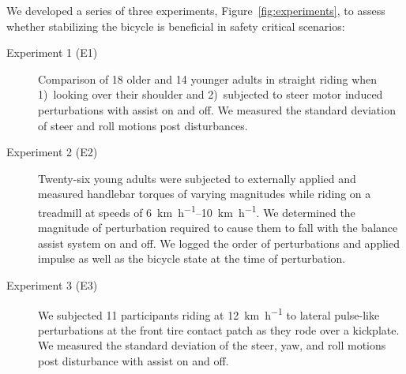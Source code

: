 \documentclass{icsc}
\def\kph{\kilo\meter\per\hour}
\begin{document}
We developed a series of three experiments, Figure~\ref{fig:experiments}, to
assess whether stabilizing the bicycle is beneficial in safety critical
scenarios:
\begin{description}
  \item[Experiment 1 (E1)] Comparison of 18 older and 14 younger adults in
    straight riding when 1)~looking over their shoulder and 2)~subjected
    to steer motor induced perturbations with assist on and off. We measured
    the standard deviation of steer and roll motions post disturbances.
  \item[Experiment 2 (E2)] Twenty-six young adults were subjected to externally
    applied and measured handlebar torques of varying magnitudes while riding
    on a treadmill at speeds of \qtyrange{6}{10}{\kph}. We determined the
    magnitude of perturbation required to cause them to fall with the balance
    assist system on and off. We logged the order of perturbations and applied
    impulse as well as the bicycle state at the time of perturbation.
  \item[Experiment 3 (E3)] We subjected 11 participants riding at 12~\si{\kph}
    to lateral pulse-like perturbations at the front tire contact patch as they
    rode over a kickplate. We measured the standard deviation of the steer,
    yaw, and roll motions post disturbance with assist on and off.
\end{description}
\end{document}
